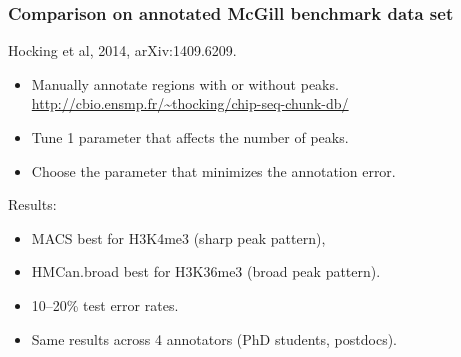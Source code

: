 \documentclass{beamer}
\begin{document}










\begin{frame}
  \frametitle{Comparison on annotated McGill benchmark data set}
  Hocking et al, 2014, arXiv:1409.6209.\\
  \begin{itemize}
  \item Manually annotate regions with or without peaks.\\
    \url{http://cbio.ensmp.fr/~thocking/chip-seq-chunk-db/}
  \item Tune 1 parameter that affects the number of peaks.
  \item Choose the parameter that minimizes the annotation error.
  \end{itemize}
  Results:
  \begin{itemize}
  \item MACS best for H3K4me3 (sharp peak pattern),
  \item HMCan.broad best for H3K36me3 (broad peak pattern).
  \item 10--20\% test error rates.
  \item Same results across 4 annotators (PhD students, postdocs).
  \end{itemize}
\end{frame}
\end{document}
